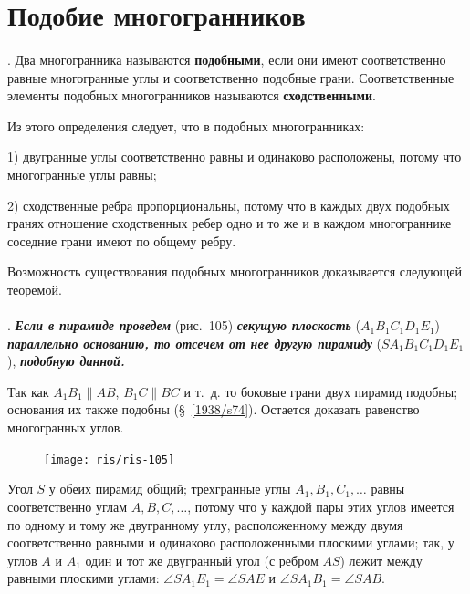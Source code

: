 \documentclass[twoside]{book}
\begin{document}
\section{Подобие многогранников}

\paragraph{}\label{1938/s93}
.
Два многогранника называются \textbf{подобными}, если они имеют соответственно равные многогранные углы и соответственно подобные грани.
Соответственные элементы подобных многогранников называются \textbf{сходственными}.

Из этого определения следует, что в подобных многогранниках:

1) двугранные углы соответственно равны и одинаково расположены, потому что многогранные углы равны;

2) сходственные ребра пропорциональны, потому что в каждых двух подобных гранях отношение сходственных ребер одно и то же и в каждом многограннике соседние грани имеют по общему ребру.

Возможность существования подобных многогранников доказывается следующей теоремой. %

\paragraph{}\label{1938/s94}
.
\textbf{\emph{Если в пирамиде проведем}} (рис.~105) \textbf{\emph{секущую плоскость}} ($A_1B_1C_1D_1E_1$) \textbf{\emph{параллельно основанию, то отсечем от нее другую пирамиду}} ($SA_1B_1C_1D_1E_1$), \textbf{\emph{подобную данной.}}

Так как $A_1B_1 \parallel AB$, $B_1C \parallel BC$ и т.~д. то боковые грани двух пирамид подобны;
основания их также подобны (§~\ref{1938/s74}).
Остается доказать равенство многогранных углов.

\begin{figure}[h!]
\centering
\texttt{[image: ris/ris-105]}
\caption{}
\end{figure}

Угол $S$ у обеих пирамид общий;
трехгранные углы $A_1, B_1, C_1,\dots$ равны соответственно углам $A, B, C,\dots$, потому что у каждой пары этих углов имеется по одному и тому же двугранному углу, расположенному между двумя соответственно равными и одинаково расположенными плоскими углами;
так, у углов $A$ и $A_1$ один и тот же двугранный угол (с ребром $AS$) лежит между равными плоскими углами: $\angle SA_1E_1 = \angle SAE$ и $\angle SA_1B_1 = \angle SAB$.
\end{document}
